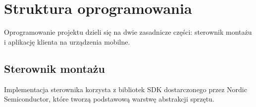 \section{Struktura oprogramowania}

Oprogramowanie projektu dzieli się na dwie zasadnicze części: sterownik montażu
i aplikację klienta na urządzenia mobilne.

\subsection{Sterownik montażu}

Implementacja sterownika korzysta z bibliotek SDK dostarczonego przez Nordic
Semiconductor, które tworzą podstawową warstwę abstrakcji sprzętu.
